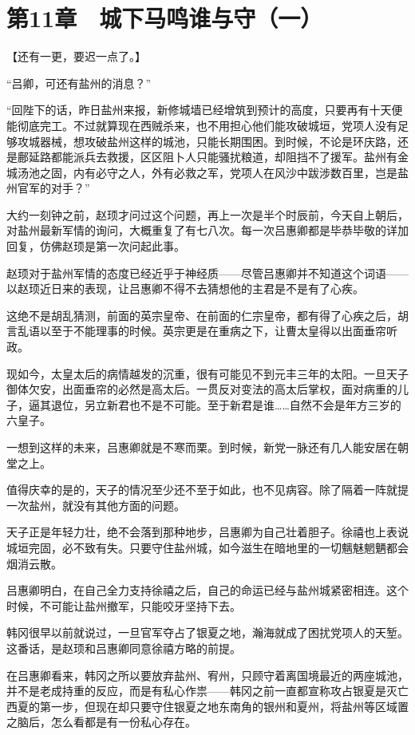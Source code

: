 \section{第11章　城下马鸣谁与守（一）}

【还有一更，要迟一点了。】

“吕卿，可还有盐州的消息？”

“回陛下的话，昨日盐州来报，新修城墙已经增筑到预计的高度，只要再有十天便能彻底完工。不过就算现在西贼杀来，也不用担心他们能攻破城垣，党项人没有足够攻城器械，想攻破盐州这样的城池，只能长期围困。到时候，不论是环庆路，还是鄜延路都能派兵去救援，区区阻卜人只能骚扰粮道，却阻挡不了援军。盐州有金城汤池之固，内有必守之人，外有必救之军，党项人在风沙中跋涉数百里，岂是盐州官军的对手？”

大约一刻钟之前，赵顼才问过这个问题，再上一次是半个时辰前，今天自上朝后，对盐州最新军情的询问，大概重复了有七八次。每一次吕惠卿都是毕恭毕敬的详加回复，仿佛赵顼是第一次问起此事。

赵顼对于盐州军情的态度已经近乎于神经质——尽管吕惠卿并不知道这个词语——以赵顼近日来的表现，让吕惠卿不得不去猜想他的主君是不是有了心疾。

这绝不是胡乱猜测，前面的英宗皇帝、在前面的仁宗皇帝，都有得了心疾之后，胡言乱语以至于不能理事的时候。英宗更是在重病之下，让曹太皇得以出面垂帘听政。

现如今，太皇太后的病情越发的沉重，很有可能见不到元丰三年的太阳。一旦天子御体欠安，出面垂帘的必然是高太后。一贯反对变法的高太后掌权，面对病重的儿子，逼其退位，另立新君也不是不可能。至于新君是谁……自然不会是年方三岁的六皇子。

一想到这样的未来，吕惠卿就是不寒而栗。到时候，新党一脉还有几人能安居在朝堂之上。

值得庆幸的是的，天子的情况至少还不至于如此，也不见病容。除了隔着一阵就提一次盐州，就没有其他方面的问题。

天子正是年轻力壮，绝不会落到那种地步，吕惠卿为自己壮着胆子。徐禧也上表说城垣完固，必不致有失。只要守住盐州城，如今滋生在暗地里的一切魑魅魍魉都会烟消云散。

吕惠卿明白，在自己全力支持徐禧之后，自己的命运已经与盐州城紧密相连。这个时候，不可能让盐州撤军，只能咬牙坚持下去。

韩冈很早以前就说过，一旦官军夺占了银夏之地，瀚海就成了困扰党项人的天堑。这番话，是赵顼和吕惠卿同意徐禧方略的前提。

在吕惠卿看来，韩冈之所以要放弃盐州、宥州，只顾守着离国境最近的两座城池，并不是老成持重的反应，而是有私心作祟——韩冈之前一直都宣称攻占银夏是灭亡西夏的第一步，但现在却只要守住银夏之地东南角的银州和夏州，将盐州等区域置之脑后，怎么看都是有一份私心存在。

